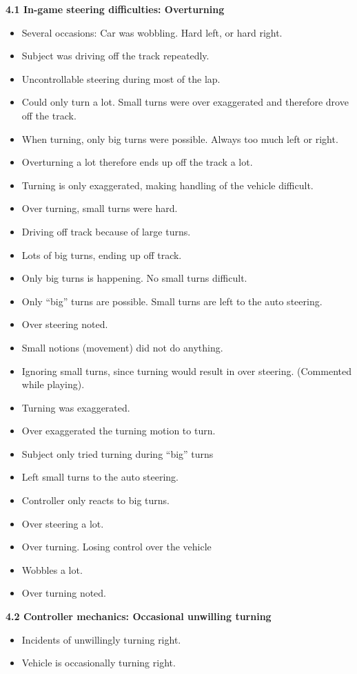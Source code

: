 \noindent\textbf{4.1 In-game steering difficulties: Overturning}
\begin{itemize}
\item Several occasions: Car was wobbling. Hard left, or hard right.
\item Subject was driving off the track repeatedly.
\item Uncontrollable steering during most of the lap.
\item Could only turn a lot. Small turns were over exaggerated and therefore drove off the track.
\item When turning, only big turns were possible. Always too much left or right.
\item Overturning a lot therefore ends up off the track a lot.
\item Turning is only exaggerated, making handling of the vehicle difficult.
\item Over turning, small turns were hard.
\item Driving off track because of large turns.
\item Lots of big turns, ending up off track.
\item Only big turns is happening. No small turns difficult.
\item Only “big” turns are possible. Small turns are left to the auto steering.
\item Over steering noted.
\item Small notions (movement) did not do anything.
\item Ignoring small turns, since turning would result in over steering. (Commented while playing).
\item Turning was exaggerated.
\item Over exaggerated the turning motion to turn.
\item Subject only tried turning during “big” turns
\item Left small turns to the auto steering.
\item Controller only reacts to big turns.
\item Over steering a lot.
\item Over turning. Losing control over the vehicle
\item Wobbles a lot.
\item Over turning noted.
\end{itemize}


\noindent\textbf{4.2 Controller mechanics: Occasional unwilling turning }
\begin{itemize}
\item Incidents of unwillingly turning right.
\item Vehicle is occasionally turning right.
\end{itemize}


